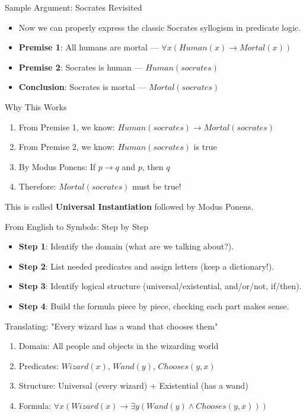 \documentclass{beamer}
\begin{document}
	\begin{frame}{Sample Argument: Socrates Revisited}
		\begin{itemize}
			\item Now we can properly express the classic Socrates syllogism in predicate logic.
			\item \textbf{Premise 1}: All humans are mortal — $\forall x (Human(x) \rightarrow Mortal(x))$
			\item \textbf{Premise 2}: Socrates is human — $Human(socrates)$  
			\item \textbf{Conclusion}: Socrates is mortal — $Mortal(socrates)$
		\end{itemize}
		
		\begin{block}{Why This Works}
			\begin{enumerate}
				\item From Premise 1, we know: $Human(socrates) \rightarrow Mortal(socrates)$
				\item From Premise 2, we know: $Human(socrates)$ is true
				\item By Modus Ponens: If $p \rightarrow q$ and $p$, then $q$
				\item Therefore: $Mortal(socrates)$ must be true!
			\end{enumerate}
			This is called \textbf{Universal Instantiation} followed by Modus Ponens.
		\end{block}
	\end{frame}
	
	\begin{frame}{From English to Symbols: Step by Step}
		\begin{itemize}
			\item \textbf{Step 1}: Identify the domain (what are we talking about?).
			\item \textbf{Step 2}: List needed predicates and assign letters (keep a dictionary!).
			\item \textbf{Step 3}: Identify logical structure (universal/existential, and/or/not, if/then).
			\item \textbf{Step 4}: Build the formula piece by piece, checking each part makes sense.
		\end{itemize}
		
		\begin{example}
			Translating: "Every wizard has a wand that chooses them"
			\begin{enumerate}
				\item Domain: All people and objects in the wizarding world
				\item Predicates: $Wizard(x)$, $Wand(y)$, $Chooses(y,x)$
				\item Structure: Universal (every wizard) + Existential (has a wand)
				\item Formula: $\forall x (Wizard(x) \rightarrow \exists y (Wand(y) \wedge Chooses(y,x)))$
			\end{enumerate}
		\end{example}
	\end{frame}
	
\end{document}
